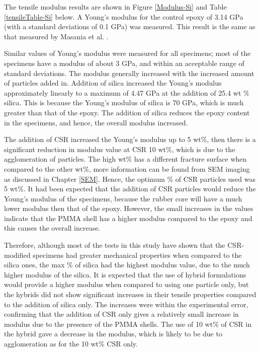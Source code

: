 \documentclass[numbers=noendperiod,chapterprefix=on]{icldt} %
\begin{document}
The tensile modulus results are shown in Figure \ref{Modulus-Si} and Table \ref{tensileTable-Si} below. 
A Young's modulus for the control epoxy of 3.14 GPa (with  a standard deviations of 0.1 GPa) was measured. This result is the same as that measured by Masania et al. \cite{Masania2010}. 


Similar values of Young's modulus were measured for all specimens; most of the specimens have a modulus of about 3 GPa, and within an acceptable range of standard deviations. The modulus generally increased with the increased amount of particles added in. Addition of silica increased the Young's modulus approximately linearly to a maximum of 4.47 GPa at the addition of 25.4 wt \% silica. This is because the Young's modulus of silica is 70 GPa, which is much greater than that of the epoxy. The addition of silica reduces the epoxy content in the specimens, and hence, the overall modulus increased.

The addition of CSR increased the Young's modulus up to 5 wt\%, then there is a significant reduction in modulus value at CSR 10 wt\%, which is due to the agglomeration of particles. The high wt\% has a different fracture surface when compared to the other wt\%, more information can be found from SEM imaging as discussed in Chapter \ref{SEM}. Hence, the optimum \% of CSR particles used was 5 wt\%. It had been expected that the addition of CSR particles would reduce the Young's modulus of the specimens, because the rubber core will have a much lower modulus then that of the epoxy. However, the small increases in the values indicate that the PMMA shell has a higher modulus compared to the epoxy and this causes the overall increase.

Therefore, although most of the tests in this study have shown that the CSR-modified specimens had greater mechanical properties when compared to the silica ones, the max \% of silica had the highest modulus value, due to the much higher modulus of the silica. 
It is expected that the use of hybrid formulations would provide a higher modulus when compared to using one particle only, but the hybrids did not show significant increases in their tensile properties compared to the addition of silica only.
The increases were within the experimental error, confirming that the addition of CSR only gives a relatively small increase in modulus due to the presence of the PMMA shells. The use of 10 wt\% of CSR in the hybrid gave a decrease in the modulus, which is likely to be due to agglomeration as for the 10 wt\% CSR only.
\end{document}
